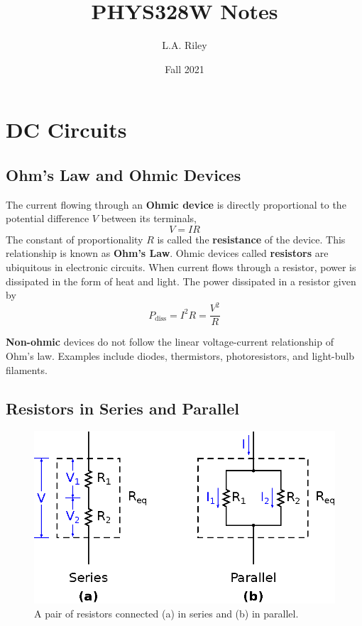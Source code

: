 \documentclass[11pt]{article}
\title{PHYS328W Notes} \author{L.A. Riley} \date{Fall 2021}
\begin{document}
\thispagestyle{empty}

\maketitle

\section{DC Circuits}

\subsection{Ohm's Law and Ohmic Devices}
\label{sec:ohm}

The current flowing through an \textbf{Ohmic device} is directly
proportional to the potential difference $V$ between its terminals,
\begin{equation}
  V=IR
\label{eq:Ohm}
\end{equation}
The constant of proportionality $R$ is called the \textbf{resistance}
of the device. This relationship is known as \textbf{Ohm's Law}. Ohmic
devices called \textbf{resistors} are ubiquitous in electronic
circuits. When current flows through a resistor, power is dissipated
in the form of heat and light. The power dissipated in a resistor
given by
\begin{equation}
  P_\mathrm{diss} = I^2 R = \frac{V^2}{R}
\end{equation}

\textbf{Non-ohmic} devices do not follow the linear voltage-current
relationship of Ohm's law. Examples include diodes, thermistors,
photoresistors, and light-bulb filaments.

\subsection{Resistors in Series and Parallel}
\label{sec:serpar}

\begin{figure}[ht]
  \begin{center}
    \includegraphics{seriesparallel.eps}
    \caption{A pair of resistors connected (a) in series and (b) in
      parallel.}
    \label{fig:seriesparallel}
  \end{center}
\end{figure}
\end{document}
